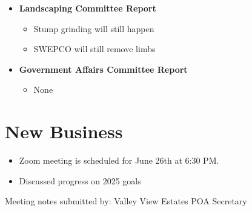 \documentclass[12pt,a4paper]{article}
\begin{document}
\begin{itemize}
\begin{itemize}
  \end{itemize}
  \item \textbf{Landscaping Committee Report}
  \begin{itemize}
    \item Stump grinding will still happen
    \item SWEPCO will still remove limbs
  \end{itemize}
  \item \textbf{Government Affairs Committee Report}
  \begin{itemize}
    \item None
  \end{itemize}
\end{itemize}

\section*{New Business}
\begin{itemize}
  \item Zoom meeting is scheduled for June 26th at 6:30 PM.
  \item Discussed progress on 2025 goals
\end{itemize}

\begin{flushleft}
Meeting notes submitted by:\break{}
\@author\break{}
Valley View Estates POA Secretary
\end{flushleft}
\end{document}
